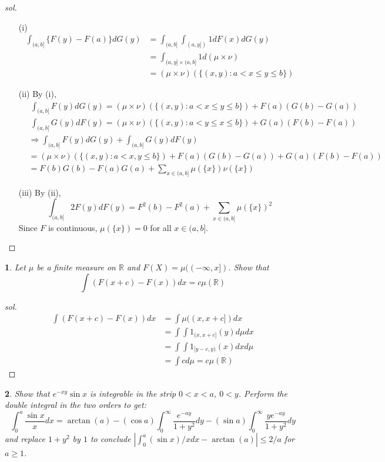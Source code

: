 \documentclass{report}
\newtheorem{ex}{}[section]
\begin{document}
\begin{proof}[sol]~
\begin{enumerate}
    \item[(i)] 
    \begin{align*}
        \int_{(a,b]} \{F(y) - F(a)\}dG(y) &= \int_{(a,b]}\int_{(a,y])}1dF(x)dG(y)\\ 
        &= \int_{(a,y]\times (a,b]}1d(\mu\times\nu)\\
        &= (\mu\times\nu)(\{(x,y):a<x\le y\le b\})
    \end{align*}
    \item[(ii)] By (i),
    \begin{align*}
        &\ \int_{(a,b]}F(y)dG(y) = (\mu\times\nu)(\{(x,y):a<x\le y\le b\}) + F(a)(G(b)-G(a)) \\
        &\ \int_{(a,b]}G(y)dF(y) = (\mu\times\nu)(\{(x,y):a<y\le x\le b\}) + G(a)(F(b)-F(a)) \\
        &\Rightarrow \int_{(a,b]}F(y)dG(y) + \int_{(a,b]}G(y)dF(y)\\
        &= (\mu\times\nu)(\{(x,y):a<x,y\le b\}) + F(a)(G(b)-G(a)) + G(a)(F(b)-F(a))\\
        &= F(b)G(b) - F(a)G(a) + \sum_{x\in(a,b]}\mu(\{x\})\nu(\{x\})
    \end{align*}
    
    \item[(iii)] By (ii),
        \[\int_{(a,b]}2F(y)dF(y) = F^2(b) - F^2(a) + \sum_{x\in(a,b]}\mu(\{x\})^2\]
    Since $F$ is continuous, $\mu(\{x\}) = 0$ for all $x \in (a,b]$.
\end{enumerate}
\end{proof}
\begin{ex}
Let $\mu$ be a finite measure on $\mathbb{R}$ and $F(X) = \mu((-\infty, x])$. Show that
\[\int (F(x+c) - F(x)) dx = c\mu(\mathbb{R})\]
\end{ex}
\begin{proof}[sol]
\begin{align*}
    \int (F(x+c) - F(x))dx &= \int \mu((x,x+c])dx\\
    &=\int\int 1_{(x,x+c]}(y) d\mu dx\\
    &=\int\int 1_{[y-c,y)}(x) dx d\mu\\
    &= \int cd\mu = c\mu(\mathbb{R})
\end{align*}
\end{proof}
\begin{ex}
Show that $e^{-xy}\sin x$ is integrable in the strip $0 < x < a$, $0 < y$. Perform the double integral in the two orders to get:
\[\int_0^a \frac{\sin x}{x}dx = \arctan(a) - (\cos a)\int_0^\infty \frac{e^{-ay}}{1+y^2}dy - (\sin a)\int_0^\infty \frac{ye^{-ay}}{1+y^2}dy\]
and replace $1+y^2$ by $1$ to conclude $|\int_0^a (\sin x)/x dx - \arctan(a)| \le 2/a$ for $a \ge 1$. 
\end{ex}
\end{document}
